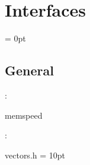 
\section{Interfaces} 


\parskip = 0pt

\vspace{3mm} \subsection*{General}

: 

memspeed
\vspace{2mm}

\vspace{5mm}

: 

vectors.h
\vspace{2mm}\parskip = 10pt 
